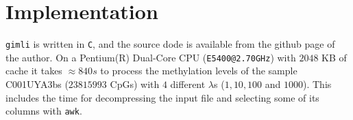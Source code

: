 \documentclass[12pt]{amsart}
\newcommand{\gimli}{\texttt{gimli}}
\begin{document}




\section{Implementation}

\gimli{} is written in \texttt{C}, and the source
dode is available from the github page of the author. 
On a Pentium(R) Dual-Core  CPU (\texttt{E5400@2.70GHz})
with $2048$ KB of cache it takes $\approx 840s$ to process the 
methylation levels of the sample C001UYA3bs ($23815993$ CpGs) 
with $4$ different $\lambda$s ($1,10,100$ and $1000$).
This includes the time for decompressing the input file and selecting some of its columns
with \texttt{awk}.




\end{document}
